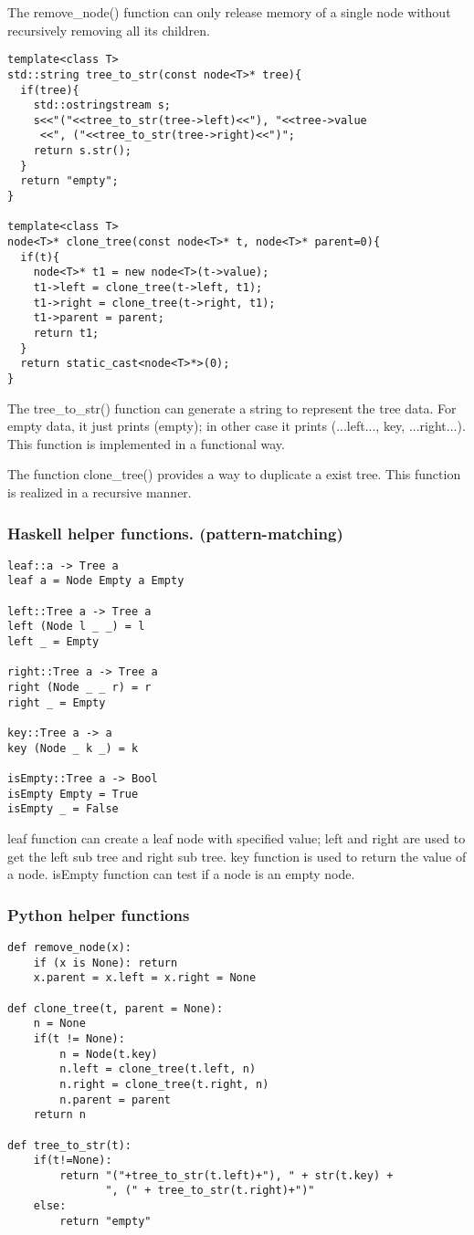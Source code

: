 \documentclass{article}
\begin{document}
The remove\_node() function can only release memory of a single node without recursively
removing all its children. 

\begin{lstlisting}
template<class T>
std::string tree_to_str(const node<T>* tree){
  if(tree){
    std::ostringstream s;
    s<<"("<<tree_to_str(tree->left)<<"), "<<tree->value
     <<", ("<<tree_to_str(tree->right)<<")";
    return s.str();
  }
  return "empty";
}

template<class T>
node<T>* clone_tree(const node<T>* t, node<T>* parent=0){
  if(t){
    node<T>* t1 = new node<T>(t->value);
    t1->left = clone_tree(t->left, t1);
    t1->right = clone_tree(t->right, t1);
    t1->parent = parent;
    return t1;
  }
  return static_cast<node<T>*>(0);
}
\end{lstlisting}

The tree\_to\_str() function can generate a string
to represent the tree data. For empty data, it just prints (empty); in other case
it prints (...left..., key, ...right...). This function is implemented in a
functional way.

The function clone\_tree() provides a way to duplicate a exist tree. This
function is realized in a recursive manner.

\subsubsection*{Haskell helper functions. (pattern-matching)}
\lstset{language=Haskell}
\begin{lstlisting}
leaf::a -> Tree a
leaf a = Node Empty a Empty

left::Tree a -> Tree a
left (Node l _ _) = l
left _ = Empty

right::Tree a -> Tree a
right (Node _ _ r) = r
right _ = Empty

key::Tree a -> a
key (Node _ k _) = k

isEmpty::Tree a -> Bool
isEmpty Empty = True
isEmpty _ = False
\end{lstlisting}

leaf function can create a leaf node with specified value; left and right
are used to get the left sub tree and right sub tree. key function is
used to return the value of a node. isEmpty function can test if a node
is an empty node.

\subsubsection*{Python helper functions}
\lstset{language=Python}
\begin{lstlisting}
def remove_node(x):
    if (x is None): return
    x.parent = x.left = x.right = None

def clone_tree(t, parent = None):
    n = None
    if(t != None):
        n = Node(t.key)
        n.left = clone_tree(t.left, n)
        n.right = clone_tree(t.right, n)
        n.parent = parent
    return n

def tree_to_str(t):
    if(t!=None):
        return "("+tree_to_str(t.left)+"), " + str(t.key) + 
               ", (" + tree_to_str(t.right)+")"
    else:
        return "empty"
\end{lstlisting}
\end{document}

